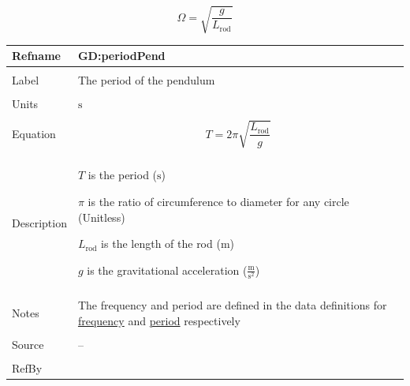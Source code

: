 \documentclass[12pt]{article}
\begin{document}
\begin{displaymath}
Ω=\sqrt{\frac{g}{{L_{\text{rod}}}}}
\end{displaymath}
\vspace{\baselineskip}
\noindent
\begin{minipage}{\textwidth}
\begin{tabular}{>{\raggedright}p{}>{\raggedright\arraybackslash}p{}}
\toprule \textbf{Refname} & \textbf{GD:periodPend}
\label{GD:periodPend}
\\ \midrule \\
Label & The period of the pendulum
        
\\ \midrule \\
Units & ${\text{s}}$
        
\\ \midrule \\
Equation & \begin{displaymath}
           T=2 π \sqrt{\frac{{L_{\text{rod}}}}{g}}
           \end{displaymath}
\\ \midrule \\
Description & \begin{symbDescription}
              \item{$T$ is the period (${\text{s}}$)}
              \item{$π$ is the ratio of circumference to diameter for any circle (Unitless)}
              \item{${L_{\text{rod}}}$ is the length of the rod (${\text{m}}$)}
              \item{$g$ is the gravitational acceleration ($\frac{\text{m}}{\text{s}^{2}}$)}
              \end{symbDescription}
\\ \midrule \\
Notes & The frequency and period are defined in the data definitions for \hyperref[DD:frequencyDD]{frequency} and \hyperref[DD:periodSHMDD]{period} respectively
        
\\ \midrule \\
Source & --
         
\\ \midrule \\
RefBy & 
\\ \bottomrule
\end{tabular}
\end{minipage}
\end{document}
